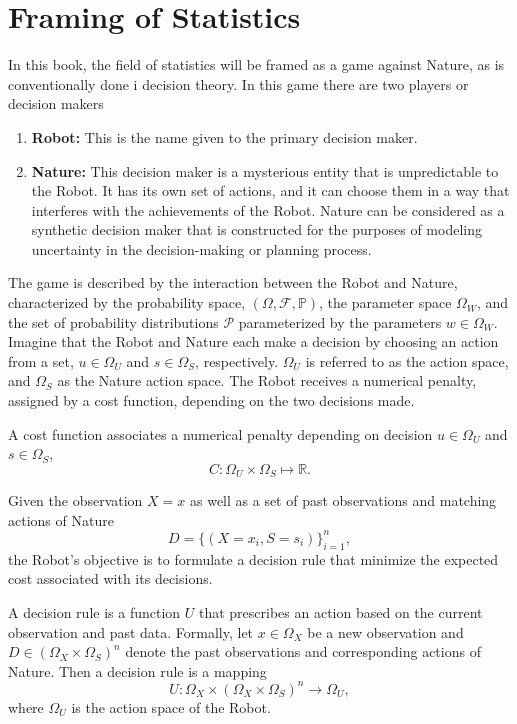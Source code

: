 \section{Framing of Statistics}
\label{sec:framing_statistics}
In this book, the field of statistics will be framed as a game against Nature, as is conventionally done i decision theory. In this game there are two players or decision makers
\begin{enumerate}
	\item \textbf{Robot:} This is the name given to the primary decision maker.
	
	\item \textbf{Nature:} This decision maker is a mysterious entity that is unpredictable to the Robot. It has its own set of actions, and it can choose them in a way that interferes with the achievements of the Robot. Nature can be considered as a synthetic decision maker that is constructed for the purposes of modeling uncertainty in the decision-making or planning process.
\end{enumerate}
The game is described by the interaction between the Robot and Nature, characterized by the probability space, $(\Omega, \mathcal{F}, \mathbb{P})$, the parameter space $\Omega_W$, and the set of probability distributions $\mathcal{P}$ parameterized by the parameters $w\in \Omega_W$. Imagine that the Robot and Nature each make a decision by choosing an action from a set, $u \in \Omega_U$ and $s \in \Omega_S$, respectively. $\Omega_U$ is referred to as the action space, and $\Omega_S$ as the Nature action space. The Robot receives a numerical penalty, assigned by a cost function, depending on the two decisions made.
\begin{definition}
	\label{def:cost_function}
	A cost function associates a numerical penalty depending on decision $u \in \Omega_U$ and $s \in \Omega_S$,
	\begin{equation}
		C: \Omega_U \times \Omega_S \mapsto \mathbb{R}.
	\end{equation}
\end{definition}
Given the observation $X=x$ as well as a set of past observations and matching actions of Nature
\begin{equation}
	D=\{(X = x_i,S= s_i)\}_{i=1}^n,
\end{equation}
the Robot's objective is to formulate a decision rule that minimize the expected cost associated with its decisions.
\begin{definition}
	\label{def:decision_rule}
	A decision rule is a function $U$ that prescribes an action based on the current observation and past data. Formally, let $x \in \Omega_X$ be a new observation and $D \in (\Omega_X \times \Omega_S)^n$ denote the past observations and corresponding actions of Nature. Then a decision rule is a mapping
	\begin{equation}
		U: \Omega_X \times (\Omega_X \times \Omega_S)^n \to \Omega_U,
	\end{equation}
	where $\Omega_U$ is the action space of the Robot.
\end{definition}

